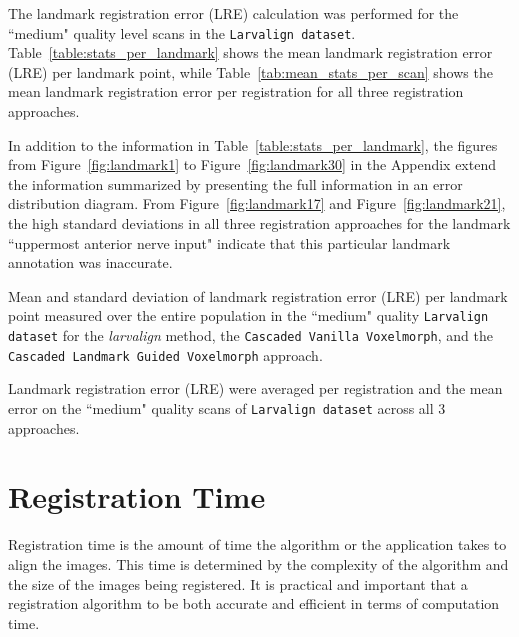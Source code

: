 \documentclass{book}
\begin{document}
	The landmark registration error (LRE) calculation was performed for the ``medium" quality level scans in the \texttt{\texttt{Larvalign dataset}}. Table~\ref{table:stats_per_landmark} shows the mean landmark registration error (LRE) per landmark point, while Table~\ref{tab:mean_stats_per_scan} shows the mean landmark registration error per registration for all three registration approaches.
	
	In addition to the information in Table~\ref{table:stats_per_landmark}, the figures from Figure~\ref{fig:landmark1} to Figure~\ref{fig:landmark30} in the Appendix extend the information summarized by presenting the full information in an error distribution diagram. From Figure~\ref{fig:landmark17} and Figure~\ref{fig:landmark21}, the high standard deviations in all three registration approaches for the landmark ``uppermost anterior nerve input" indicate that this particular landmark annotation was inaccurate.
	
	\begin{table}[h]
		\centering
		
		\caption{Mean and standard deviation of landmark registration error (LRE) per landmark point measured over the entire population in the ``medium" quality \texttt{Larvalign dataset} for the \textit{larvalign} method, the \texttt{Cascaded Vanilla Voxelmorph}, and the \texttt{Cascaded Landmark Guided Voxelmorph} approach.}
		\label{table:stats_per_landmark}
	\end{table}	

	\begin{table}[h!]
		\centering
		
		\caption{Landmark registration error (LRE) were averaged per registration and the mean error on the ``medium" quality scans of \texttt{Larvalign dataset} across all 3 approaches.}
		\label{tab:mean_stats_per_scan}
	\end{table}

	\section{Registration Time} \label{sec:RegTime}
	Registration time is the amount of time the algorithm or the application takes to align the images. This time is determined by the complexity of the algorithm and the size of the images being registered. It is practical and important that a registration algorithm to be both accurate and efficient in terms of computation time.
	
\end{document}
